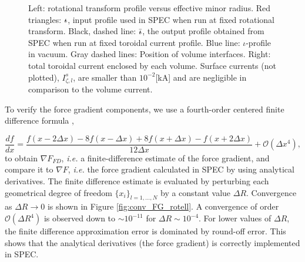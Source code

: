 \documentclass[my_thesis.tex]{subfiles}
\begin{document}
\begin{figure}
	\centering
	\hfill
	\hfill
	\hfill
	\caption{Left: rotational transform profile versus effective minor radius. Red triangles: $\text{$\iota\!\!$-}$, input profile used in \ac{SPEC} when run at fixed rotational transform. Black, dashed line: $\bar{\text{$\iota\!\!$-}}$, the output profile obtained from \ac{SPEC} when run at fixed toroidal current profile. Blue line: $\iota$-profile in vacuum. Gray dashed lines: Position of volume interfaces. Right: total toroidal current enclosed by each volume. Surface currents (not plotted), $I^s_{\zeta,l}$, are smaller than $10^{-2}$[kA] and are negligible in comparison to the volume current.}
	\label{fig:iota_and_current_profile}
\end{figure}

To verify the force gradient components, we use a fourth-order centered finite difference formula \citep{Fornberg1988},

\begin{equation}
	\frac{d f}{d x} = \frac{f(x-2\Delta x)  - 8f(x-\Delta x) + 8f(x+\Delta x) - f(x+2\Delta x)}{12\Delta x} + \mathcal{O}(\Delta x^4),
\end{equation}
to obtain $\nabla F_{FD}$, \textit{i.e.} a finite-difference estimate of the force gradient, and compare it to $\nabla F$, \textit{i.e.} the force gradient calculated in \ac{SPEC} by using analytical derivatives. The finite difference estimate is evaluated by perturbing each geometrical degree of freedom $\{x_i\}_{l=1,\ldots,N}$ by a constant value $\Delta R$. Convergence as $\Delta R\rightarrow 0$ is shown in Figure \ref{fig:conv_FG_rotell}. A convergence of order $\mathcal{O}(\Delta R^4)$ is observed down to $\sim 10^{-11}$ for $\Delta R\sim 10^{-4}$. For lower values of $\Delta R$, the finite difference approximation error is dominated by round-off error. This shows that the analytical derivatives (the force gradient) is correctly implemented in \ac{SPEC}.
\end{document}
